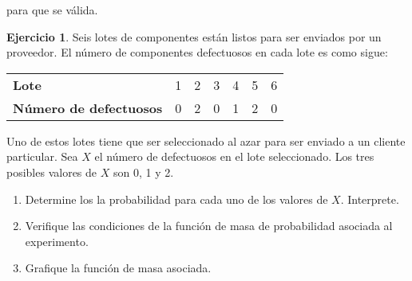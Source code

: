 \documentclass[
]{book}
\providecommand{\tightlist}{%
  \setlength{\itemsep}{0pt}\setlength{\parskip}{0pt}}
\theoremstyle{definition}
\theoremstyle{definition}
\theoremstyle{definition}
\newtheorem{exercise}{Ejercicio}[chapter]
\theoremstyle{definition}
\theoremstyle{remark}
\begin{document}
para que se válida.

\begin{exercise}

Seis lotes de componentes están listos para ser enviados por un proveedor. El número de componentes defectuosos en cada lote es como sigue:

\begin{table}[H]
\centering
\begin{tabular}{>{}lclclcl}
\toprule
\textbf{Lote} & 1 & 2 & 3 & 4 & 5 & 6\\
\textbf{Número de defectuosos} & 0 & 2 & 0 & 1 & 2 & 0\\
\bottomrule
\end{tabular}
\end{table}

\end{exercise}

Uno de estos lotes tiene que ser seleccionado al azar para ser enviado a un cliente particular. Sea \(X\) el número de defectuosos en el lote seleccionado. Los tres posibles valores de \(X\) son 0, 1 y 2.

\begin{enumerate}
\def\labelenumi{\alph{enumi}.}
\tightlist
\item
  Determine los la probabilidad para cada uno de los valores de \(X\). Interprete.
\item
  Verifique las condiciones de la función de masa de probabilidad asociada al experimento.
\item
  Grafique la función de masa asociada.
\end{enumerate}
\end{document}
